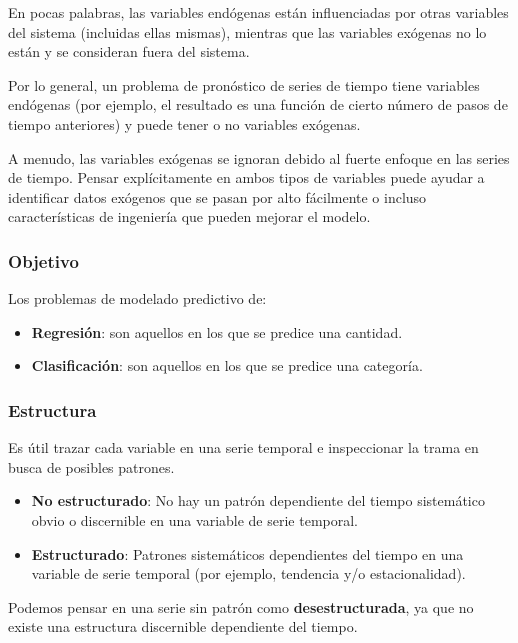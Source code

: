 \documentclass[a4paper,12pt]{article}
\begin{document}
En pocas palabras, las variables endógenas están influenciadas por otras variables del sistema (incluidas ellas mismas), mientras que las variables exógenas no lo están y se consideran fuera del sistema.

Por lo general, un problema de pronóstico de series de tiempo tiene variables endógenas (por ejemplo, el resultado es una función de cierto número de pasos de tiempo anteriores) y puede tener o no variables exógenas.

A menudo, las variables exógenas se ignoran debido al fuerte enfoque en las series de tiempo. Pensar explícitamente en ambos tipos de variables puede ayudar a identificar datos exógenos que se pasan por alto fácilmente o incluso características de ingeniería que pueden mejorar el modelo.

\subsubsection{Objetivo}

Los problemas de modelado predictivo de:

\begin{itemize}[noitemsep, topsep=2pt]
	\item \textbf{Regresión}: son aquellos en los que se predice una cantidad.
	\item  \textbf{Clasificación}: son aquellos en los que se predice una categoría.
\end{itemize}

\clearpage

\subsubsection{Estructura}

Es útil trazar cada variable en una serie temporal e inspeccionar la trama en busca de posibles patrones.

\begin{itemize}[noitemsep, topsep=2pt]
	\item \textbf{No estructurado}: No hay un patrón dependiente del tiempo sistemático obvio o discernible en una variable de serie temporal.
	\item \textbf{Estructurado}: Patrones sistemáticos dependientes del tiempo en una variable de serie temporal (por ejemplo, tendencia y/o estacionalidad).
\end{itemize}

Podemos pensar en una serie sin patrón como \textbf{desestructurada}, ya que no existe una estructura discernible dependiente del tiempo.
\end{document}
